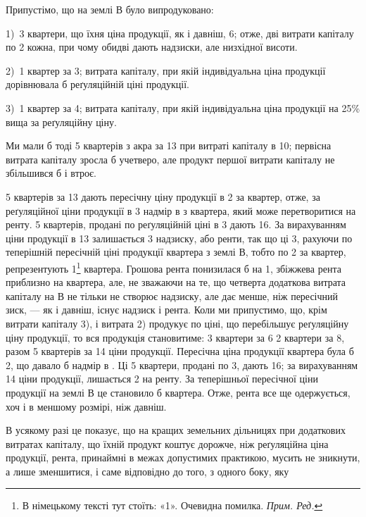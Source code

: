 Припустімо, що на землі $В$ було випродуковано:

1)~3 квартери, що їхня ціна продукції, як і давніш, 6; отже,
дві витрати капіталу по  2 кожна, при чому обидві дають надзиски,
але низхідної висоти.

2)~1 квартер за 3; витрата капіталу, при якій індивідуальна
ціна продукції дорівнювала б реґуляційній ціні продукції.

3)~1 квартер за 4; витрата капіталу, при якій індивідуальна
ціна продукції на 25\% вища за реґуляційну ціну.

Ми мали б тоді 5 квартерів з акра за 13 при витраті капіталу
в 10; первісна витрата капіталу зросла б учетверо, але продукт
першої витрати капіталу не збільшився б і втроє.

5 квартерів за 13 дають пересічну ціну продукції в 2
за квартер, отже, за реґуляційної ціни продукції в 3 надмір
в  з квартера, який може перетворитися на ренту.
5 квартерів, продані по реґуляційній ціні в 3 дають
16. За вирахуванням
ціни продукції в 13 залишається 3 надзиску, або
ренти, так що ці 3, рахуючи по теперішній пересічній ціні
продукції квартера з землі $В$, тобто по 2 за квартер,
репрезентують 1\footnote*{
В німецькому тексті тут стоїть: «1». Очевидна помилка. \emph{Прим. Ред.}
} квартера. Грошова рента понизилася б на 1, збіжжева
рента приблизно на  квартера, але, не зважаючи на те, що четверта додаткова
витрата капіталу на $В$ не тільки не створює надзиску, але дає менше, ніж
пересічний зиск, — як і давніш, існує надзиск і рента. Коли ми припустимо, що,
крім витрати капіталу 3), і витрата 2) продукує по ціні, що перебільшує реґуляційну
ціну продукції, то вся продукція становитиме: 3 квартери за
6 \dplus{} 2 квартери за 8, разом 5 квартерів за 14
ціни продукції. Пересічна ціна продукції квартера була б 2,
що давало б надмір в . Ці 5  квартери, продані по
3, дають 16; за вирахуванням
14 ціни продукції, лишається 2 на ренту. За теперішньої
пересічної ціни продукції на землі $В$ це становило б  квартера.
Отже, рента все ще одержується, хоч і в меншому розмірі, ніж давніш.

В усякому разі це показує, що на кращих земельних дільницях при додаткових
витратах капіталу, що їхній продукт коштує дорожче, ніж реґуляційна
ціна продукції, рента, принаймні в межах допустимих практикою, мусить не
зникнути, а лише зменшитися, і саме відповідно до того, з одного боку, яку
\parbreak{}  %
